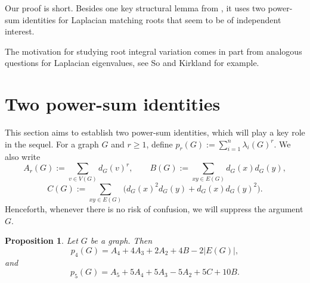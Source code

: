 \documentclass[11pt]{amsart}
\numberwithin{equation}{section}
\newtheorem{proposition}[theorem]{Proposition}
\begin{document}
Our proof is short. Besides one key structural lemma from \cite{WCC}, it uses two power-sum 
identities for Laplacian matching roots that seem to be of independent interest.

The motivation for studying  root integral variation comes in part from analogous questions for Laplacian eigenvalues, see So \cite{So} and Kirkland \cite{Kirkland} for example.

\section{Two power-sum identities}

This section aims to establish two power-sum identities, which will play a key role in the sequel. For a graph $G$ and $r\geq 1$, define
$p_r(G):=\sum_{i=1}^n \lambda_i(G)^r$. We also write
\[
A_r(G):=\sum_{v\in V(G)} d_G(v)^r,
\qquad
B(G):=\sum_{xy\in E(G)} d_G(x)d_G(y),
\]
\[
C(G):=\sum_{xy\in E(G)}\bigl(d_G(x)^2d_G(y)+d_G(x)d_G(y)^2\bigr).
\]
Henceforth, whenever there is no risk of confusion, we will suppress the argument $G$.

\begin{proposition}\label{prop:powersums}
Let $G$ be a graph. Then
\[
p_4(G)=A_4+4A_3+2A_2+4B-2|E(G)|,
\]
and
\[
p_5(G)=A_5+5A_4+5A_3-5A_2+5C+10B.
\]
\end{proposition}
\end{document}
